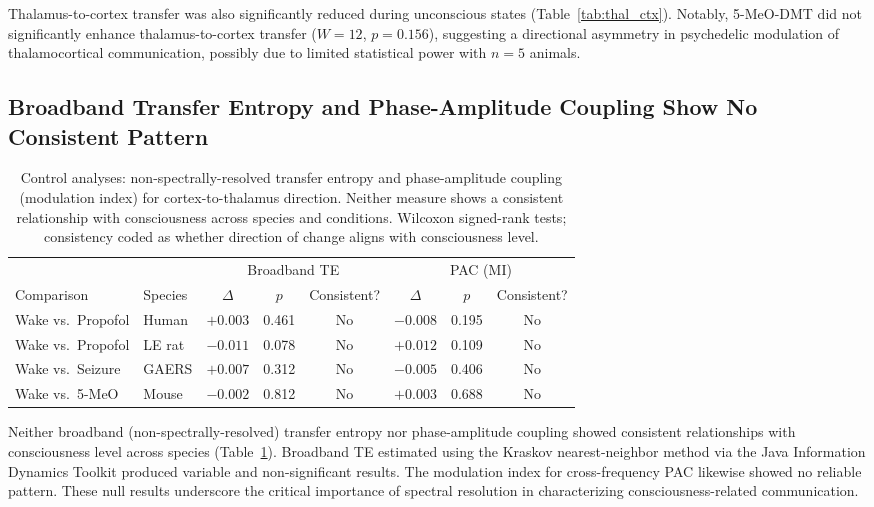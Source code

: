 \documentclass[11pt]{article}
\begin{document}
Thalamus-to-cortex transfer was also significantly reduced during unconscious states (Table~\ref{tab:thal_ctx}). Notably, 5-MeO-DMT did not significantly enhance thalamus-to-cortex transfer ($W = 12$, $p = 0.156$), suggesting a directional asymmetry in psychedelic modulation of thalamocortical communication, possibly due to limited statistical power with $n = 5$ animals.

\subsection{Broadband Transfer Entropy and Phase-Amplitude Coupling Show No Consistent Pattern}

\begin{table}[H]
\centering
\caption{Control analyses: non-spectrally-resolved transfer entropy and phase-amplitude coupling (modulation index) for cortex-to-thalamus direction. Neither measure shows a consistent relationship with consciousness across species and conditions. Wilcoxon signed-rank tests; consistency coded as whether direction of change aligns with consciousness level.}
\label{tab:controls}
\begin{tabular}{llcccccc}
\toprule
 & & \multicolumn{3}{c}{Broadband TE} & \multicolumn{3}{c}{PAC (MI)} \\
\cmidrule(lr){3-5} \cmidrule(lr){6-8}
Comparison & Species & $\Delta$ & $p$ & Consistent? & $\Delta$ & $p$ & Consistent? \\
\midrule
Wake vs.\ Propofol & Human & $+0.003$ & 0.461 & No & $-0.008$ & 0.195 & No \\
Wake vs.\ Propofol & LE rat & $-0.011$ & 0.078 & No & $+0.012$ & 0.109 & No \\
Wake vs.\ Seizure & GAERS & $+0.007$ & 0.312 & No & $-0.005$ & 0.406 & No \\
Wake vs.\ 5-MeO & Mouse & $-0.002$ & 0.812 & No & $+0.003$ & 0.688 & No \\
\bottomrule
\end{tabular}
\end{table}

Neither broadband (non-spectrally-resolved) transfer entropy nor phase-amplitude coupling showed consistent relationships with consciousness level across species (Table~\ref{tab:controls}). Broadband TE estimated using the Kraskov nearest-neighbor method \citep{kraskov2004estimating} via the Java Information Dynamics Toolkit \citep{lizier2014jidt} produced variable and non-significant results. The modulation index for cross-frequency PAC \citep{tort2010measuring} likewise showed no reliable pattern. These null results underscore the critical importance of spectral resolution in characterizing consciousness-related communication.
\end{document}
